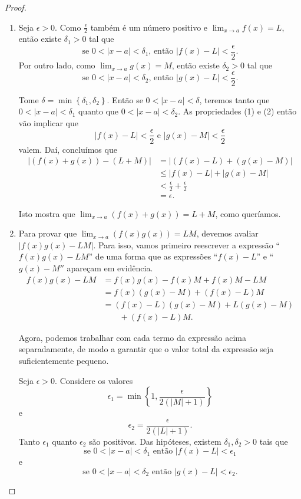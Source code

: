 \begin{proof}
	\begin{enumerate}
		\item Seja $\epsilon>0$. Como $\frac{\epsilon}{2}$ também é um número positivo  e $\lim_{x\to a}f(x)=L$, então existe $\delta_1>0$ tal que
		\[\text{se }0<|x-a|<\delta_1\text{, então }|f(x)-L|<\frac{\epsilon}{2}.\tag{1}\]
		Por outro lado, como $\lim_{x\to a}g(x)=M$, então existe $\delta_2>0$ tal que
		\[\text{se }0<|x-a|<\delta_2\text{, então }|g(x)-L|<\frac{\epsilon}{2}.\tag{2}\]
		
		Tome $\delta=\min\left\{\delta_1,\delta_2\right\}$. Então se $0<|x-a|<\delta$, teremos tanto que $0<|x-a|<\delta_1$ quanto que $0<|x-a|<\delta_2$. As propriedades (1) e (2) então vão implicar que
		\[|f(x)-L|<\frac{\epsilon}{2}\text{ e }|g(x)-M|<\frac{\epsilon}{2}\]
		valem. Daí, concluímos que
		\begin{align*}
			|(f(x)+g(x))-(L+M)|&=|(f(x)-L)+(g(x)-M)|\\
				&\leq |f(x)-L|+|g(x)-M|\\
				&<\frac{\epsilon}{2}+\frac{\epsilon}{2}\\
				&=\epsilon.
		\end{align*}
		
		Isto mostra que $\lim_{x\to a}(f(x)+g(x))=L+M$, como queríamos.
		
		\item Para provar que $\lim_{x\to a}(f(x)g(x))=LM$, devemos avaliar $|f(x)g(x)-LM|$. Para isso, vamos primeiro reescrever a expressão ``$f(x)g(x)-LM$'' de uma forma que as expressões ``$f(x)-L$'' e ``$g(x)-M''$ apareçam em evidência.
		\begin{align*}
			f(x)g(x)-LM
				&=f(x)g(x)-f(x)M+f(x)M-LM\\
				&=f(x)(g(x)-M)+(f(x)-L)M\\
				&=(f(x)-L)(g(x)-M)+L(g(x)-M)\\
				&\qquad+(f(x)-L)M.\tag{3}
		\end{align*}
		
		Agora, podemos trabalhar com cada termo da expressão acima separadamente, de modo a garantir que o valor total da expressão seja suficientemente pequeno.
		
		Seja $\epsilon>0$. Considere os valores
		\[\epsilon_1=\min\left\{1,\frac{\epsilon}{2(|M|+1)}\right\}\]
		e
		\[\epsilon_2=\frac{\epsilon}{2(|L|+1)}.\]
		Tanto $\epsilon_1$ quanto $\epsilon_2$ são positivos. Das hipóteses, existem $\delta_1,\delta_2>0$ tais que
		\[\text{se }0<|x-a|<\delta_1\text{ então }|f(x)-L|<\epsilon_1\]
		e
		\[\text{se }0<|x-a|<\delta_2\text{ então }|g(x)-L|<\epsilon_2.\]
		

\end{enumerate}
\end{proof}
